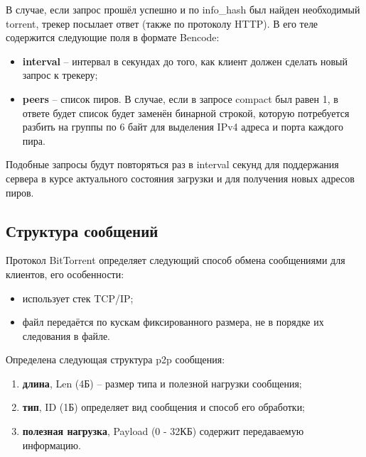В случае, если запрос прошёл успешно и по info\_hash был найден необходимый torrent, трекер посылает ответ (также по протоколу HTTP). В его теле содержится следующие поля в формате Bencode:
\begin{itemize}
	\item \textbf{interval} -- интервал в секундах до того, как клиент должен сделать новый запрос к трекеру;
	
	\item \textbf{peers} -- список пиров. В случае, если в запросе compact был равен 1, в ответе будет список будет заменён бинарной строкой, которую потребуется разбить на группы по 6 байт для выделения IPv4 адреса и порта каждого пира. \\
\end{itemize}

Подобные запросы будут повторяться раз в interval секунд для поддержания сервера в курсе актуального состояния загрузки и для получения новых адресов пиров. \newline

\subsection{Структура сообщений}
Протокол BitTorrent определяет следующий способ обмена сообщениями для клиентов, его особенности:
\begin{itemize}
	\item использует стек TCP/IP;
	
	\item файл передаётся по кускам фиксированного размера, не в порядке их следования в файле. \\
\end{itemize}

Определена следующая структура p2p сообщения:
\begin{enumerate}
	\item \textbf{длина}, Len (4Б) -- размер типа и полезной нагрузки сообщения;
	
	\item \textbf{тип}, ID (1Б) определяет вид сообщения и способ его обработки;
	
	\item \textbf{полезная нагрузка}, Payload (0 - 32КБ) содержит передаваемую информацию. \\
\end{enumerate}

